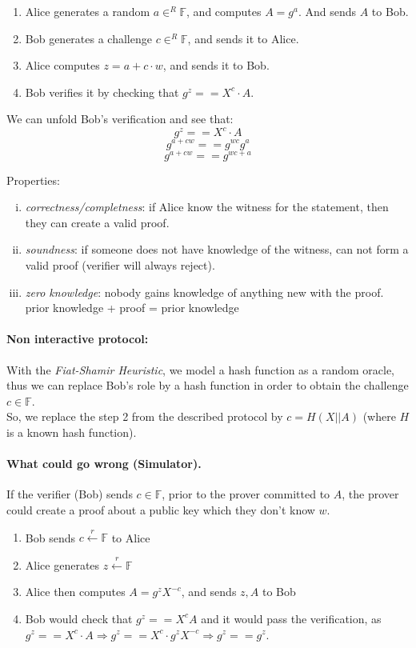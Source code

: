 \documentclass{article}
\begin{document}
\begin{enumerate}[1.]
	\item Alice generates a random $a \in^R \mathbb{F}$, and computes $A=g^a$. And sends $A$ to Bob.
	\item Bob generates a challenge $c \in^R \mathbb{F}$, and sends it to Alice.
	\item Alice computes $z=a + c \cdot w$, and sends it to Bob.
	\item Bob verifies it by checking that $g^z == X^c \cdot A$.
\end{enumerate}

We can unfold Bob's verification and see that:
$$g^z == X^c \cdot A$$
$$g^{a+cw} == g^{wc} g^a$$
$$g^{a+cw} == g^{wc+a}$$

Properties:
\begin{enumerate}[i.]
	\item \emph{correctness/completness}: if Alice know the witness for the statement, then they can create a valid proof.
	\item \emph{soundness}: if someone does not have knowledge of the witness, can not form a valid proof (verifier will always reject).
	\item \emph{zero knowledge}: nobody gains knowledge of anything new with the proof. prior knowledge + proof = prior knowledge
\end{enumerate}

\paragraph{Non interactive protocol:}
With the \emph{Fiat-Shamir Heuristic}, we model a hash function as a random oracle, thus we can replace Bob's role by a hash function in order to obtain the challenge $c \in \mathbb{F}$.
\\
So, we replace the step 2 from the described protocol by $c = H(X || A)$ (where $H$ is a known hash function).

\paragraph{What could go wrong (Simulator).}
If the verifier (Bob) sends $c \in \mathbb{F}$, prior to the prover committed to $A$, the prover could create a proof about a public key which they don't know $w$.
\begin{enumerate}[1.]
	\item Bob sends $c \xleftarrow{r} \mathbb{F}$ to Alice
	\item Alice generates $z \xleftarrow{r} \mathbb{F}$
	\item Alice then computes $A = g^z X^{-c}$, and sends $z, A$ to Bob
	\item Bob would check that $g^z == X^c A$ and it would pass the verification, as $g^z== X^c \cdot A \Rightarrow g^z==X^c \cdot g^z X^{-c} \Rightarrow g^z == g^z$.
\end{enumerate}
\end{document}
